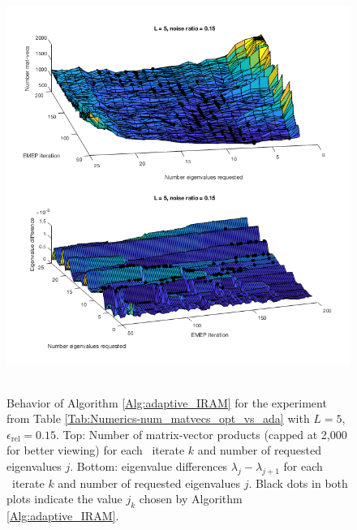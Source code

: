 \begin{figure}[H]
\centering
\hbox{\hspace{-0.5cm} \includegraphics[scale=0.65]{Numerics-surf_num_mvs_and_eig_diffs_1} }\vspace{0.0cm}
	\caption{Behavior of Algorithm \ref{Alg:adaptive_IRAM} for the experiment from Table \ref{Tab:Numerics-num_matvecs_opt_vs_ada} with $L=5$, $\epsilon_\text{rel}=0.15$.  Top: Number of matrix-vector products (capped at 2,000 for better viewing) for each \emep \ iterate $k$ and number of requested eigenvalues $j$. Bottom: eigenvalue differences $\lambda_j - \lambda_{j+1}$ for each \emep \ iterate $k$ and number of requested eigenvalues $j$.  Black dots in both plots indicate the value $j_k$ chosen by Algorithm \ref{Alg:adaptive_IRAM}.}
\label{Fig:Numerics-surf_mvs_eig_diffs_1}
\end{figure}



